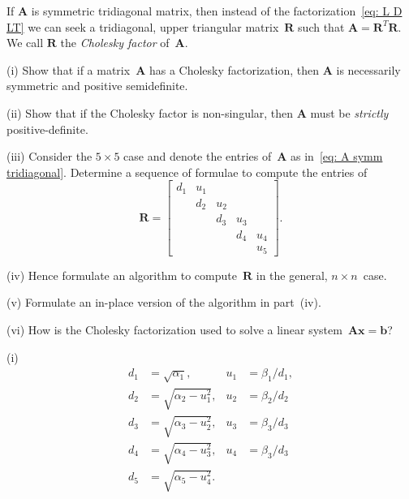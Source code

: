 \begin{Exercises}
\exercise
If $\boldsymbol{A}$ is symmetric tridiagonal matrix, then instead of the 
factorization~\eqref{eq: L D LT} we can seek a tridiagonal, upper triangular
matrix~$\boldsymbol{R}$ such that 
$\boldsymbol{A}=\boldsymbol{R}^T\boldsymbol{R}$.  We call $\boldsymbol{R}$ the 
\emph{Cholesky factor} of~$\boldsymbol{A}$.
\begin{description}
\item{(i)} Show that if a matrix~$\boldsymbol{A}$ has a Cholesky factorization, 
then $\boldsymbol{A}$ is necessarily symmetric and positive semidefinite.
\item{(ii)} Show that if the Cholesky factor is non-singular, then 
$\boldsymbol{A}$ must be \emph{strictly} positive-definite.
\item{(iii)} Consider the $5\times5$ case and denote the entries 
of~$\boldsymbol{A}$ as in~\eqref{eq: A symm tridiagonal}.  Determine a sequence 
of formulae to compute the entries of
\[
\boldsymbol{R}=\begin{bmatrix}
d_1&u_1&   &   &\\
   &d_2&u_2&   &\\
   &   &d_3&u_3&\\
   &   &   &d_4&u_4\\
   &   &   &   &u_5\end{bmatrix}.
\]
\item{(iv)} Hence formulate an algorithm to compute~$\boldsymbol{R}$ in the 
general, $n\times n$~case.
\item{(v)} Formulate an in-place version of the algorithm in part~(iv).
\item{(vi)} How is the Cholesky factorization used to solve a linear 
system~$\boldsymbol{A}\boldsymbol{x}=\boldsymbol{b}$?
\end{description}
\begin{ans}
(i)
\[
\begin{aligned}
d_1&=\sqrt{\alpha_1},&u_1&=\beta_1/d_1,\\
d_2&=\sqrt{\alpha_2-u_1^2},&u_2&=\beta_2/d_2\\
d_3&=\sqrt{\alpha_3-u_2^2},&u_3&=\beta_3/d_3\\
d_4&=\sqrt{\alpha_4-u_3^2},&u_4&=\beta_3/d_3\\
d_5&=\sqrt{\alpha_5-u_4^2}.
\end{aligned}
\]
\end{ans}



\end{Exercises}
